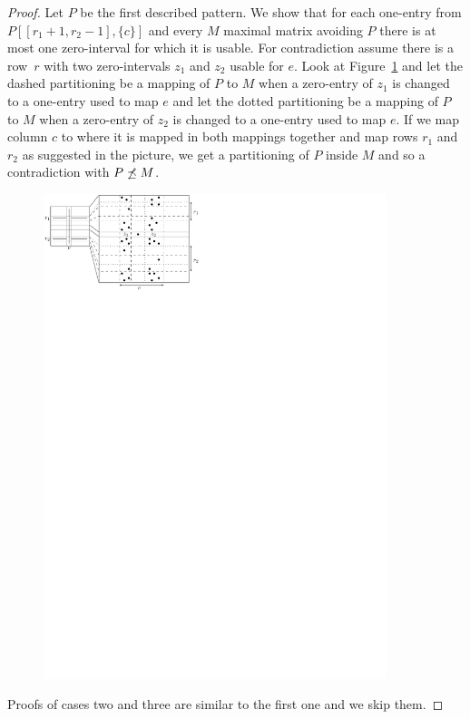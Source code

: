 \begin{proof}
Let $P$ be the first described pattern. We show that for each one-entry from $P[[r_1+1,r_2-1],\{c\}]$ and every $M$ maximal matrix avoiding $P$ there is at most one zero-interval for which it is usable. For contradiction assume there is a row~$r$ with two zero-intervals $z_1$ and $z_2$ usable for $e$. Look at Figure~\ref{fig:lemmaI1} and let the dashed partitioning be a mapping of $P$ to $M$ when a zero-entry of $z_1$ is changed to a one-entry used to map $e$ and let the dotted partitioning be a mapping of $P$ to $M$ when a zero-entry of $z_2$ is changed to a one-entry used to map $e$. If we map column $c$ to where it is mapped in both mappings together and map rows $r_1$ and $r_2$ as suggested in the picture, we get a partitioning of $P$ inside $M$ and so a contradiction with $P\not\preceq M$.

\begin{figure}[!ht]
\centering
\includegraphics[width=100mm]{img/lemmaI1.pdf}
\caption{}
\label{fig:lemmaI1}
\end{figure}
Proofs of cases two and three are similar to the first one and we skip them.


\end{proof}

